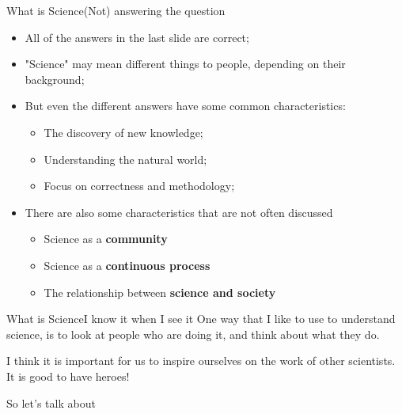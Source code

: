 \begin{frame}{What is Science}{(Not) answering the question}
  \begin{itemize}
    \item All of the answers in the last slide are correct;
    \item "Science" may mean different things to people, depending on their background;
    \item But even the different answers have some common characteristics:
    \begin{itemize}
      \item The discovery of new knowledge;
      \item Understanding the natural world;
      \item Focus on correctness and methodology;
    \end{itemize}
    \item There are also some characteristics that are not often discussed
    \begin{itemize}
      \item Science as a {\bf community}
      \item Science as a {\bf continuous process}
      \item The relationship between {\bf science and society}
    \end{itemize}
  \end{itemize}
\end{frame}

\begin{frame}{What is Science}{I know it when I see it}
  One way that I like to use to understand science, is to look at people who are doing it, and think about what they do.\bigskip

  I think it is important for us to inspire ourselves on the work of other scientists. It is good to have heroes!\bigskip

  So let's talk about 
\end{frame}

